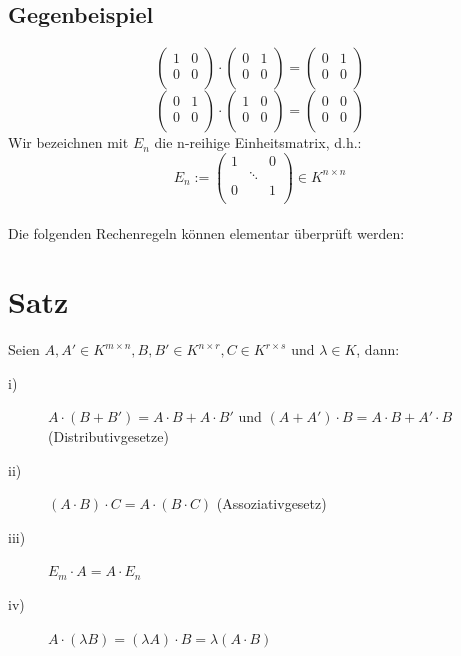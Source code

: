 \documentclass{scrbook}
\begin{document}
\subsection*{Gegenbeispiel}
\[
\left(
\begin{array}{cc}
1&0\\
0&0\\
\end{array}
\right) \cdot
\left(
\begin{array}{cc}
0&1\\
0&0\\
\end{array}
\right) = 
\left(
\begin{array}{cc}
0&1\\
0&0\\
\end{array}
\right)
\]
\[
\left(
\begin{array}{cc}
0&1\\
0&0\\
\end{array}
\right) \cdot
\left(
\begin{array}{cc}
1&0\\
0&0\\
\end{array}
\right) = 
\left(
\begin{array}{cc}
0&0\\
0&0\\
\end{array}
\right)
\]
Wir bezeichnen mit $E_n$ die n-reihige Einheitsmatrix, d.h.:
\[
E_n := \left(
\begin{array}{ccc}
1&&0\\
&\ddots&\\
0&&1\\
\end{array}
\right)\in K^{n\times n}
\]\\
Die folgenden Rechenregeln können elementar überprüft werden:
\section{Satz}
Seien $A,A' \in K^{m \times n},B,B' \in K^{n\times r},C \in K^{r \times s}$ und $\lambda \in K$, dann:
\begin{description}
\item[i)] $A\cdot(B+B') = A\cdot B + A\cdot B'$ und $(A+A')\cdot B = A\cdot B + A' \cdot B$ (Distributivgesetze)
\item[ii)] $(A\cdot B)\cdot C = A\cdot (B\cdot C)$ (Assoziativgesetz)
\item[iii)] $E_m \cdot A = A\cdot E_n$
\item[iv)] $A\cdot (\lambda B) = (\lambda A)\cdot B = \lambda (A\cdot B)$
\end{description}
\end{document}
